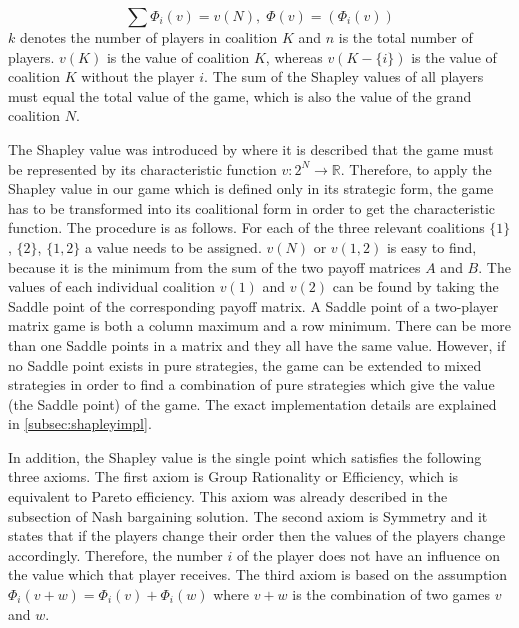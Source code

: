 {\begin{equation}
\sum \Phi_i(v) = v(N), \; \Phi(v) = (\Phi_i(v))
\end{equation}
$k$ denotes the number of players in coalition $K$ and $n$ is the total number of players. $v(K)$ is the value of coalition $K$, whereas $v(K - \{i\})$ is the value of coalition $K$ without the player $i$. The sum of the Shapley values of all players must equal the total value of the game, which is also the value of the grand coalition $N$.

The Shapley value was introduced by \citet{shapley1952value} where it is described that the game must be represented by its characteristic function $v: 2^N	\rightarrow \mathbb{R}$. Therefore, to apply the Shapley value in our game which is defined only in its strategic form, the game has to be transformed into its coalitional form in order to get the characteristic function. The procedure is as follows. For each of the three relevant coalitions $\{1\}$, $\{2\}$, $\{1,2\}$ a value needs to be assigned. $v(N)$ or $v(1,2)$ is easy to find, because it is the minimum from the sum of the two payoff matrices $A$ and $B$. The values of each individual coalition $v(1)$ and $v(2)$ can be found by taking the Saddle point of the corresponding payoff matrix. A Saddle point of a two-player matrix game is both a column maximum and a row minimum. There can be more than one Saddle points in a matrix and they all have the same value. However, if no Saddle point exists in pure strategies, the game can be extended to mixed strategies in order to find a combination of pure strategies which give the value (the Saddle point) of the game. The exact implementation details are explained in \ref{subsec:shapleyimpl}.

In addition, the Shapley value is the single point which satisfies the following three axioms. The first axiom is Group Rationality or Efficiency, which is equivalent to Pareto efficiency. This axiom was already described in the subsection of Nash bargaining solution. The second axiom is Symmetry and it states that if the players change their order then the values of the players change accordingly. Therefore, the number $i$ of the player does not have an influence on the value which that player receives. The third axiom is based on the assumption $\Phi_i(v+w) = \Phi_i(v) + \Phi_i(w)$ where $v+w$ is the combination of two games $v$ and $w$.

}
